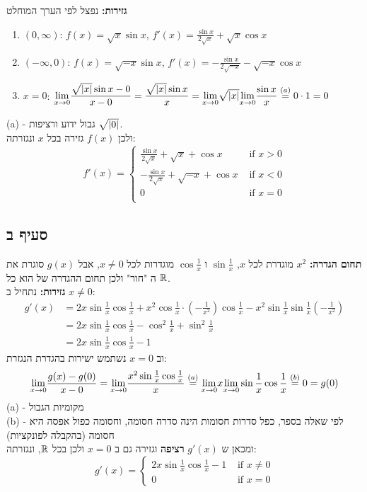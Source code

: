 \documentclass{article}
\begin{document}
	\textbf{גזירות:} נפצל לפי הערך המוחלט
	\begin{enumerate}
		\item $(0, \infty)$: $f(x) = \sqrt{x} \sin x$, $f'(x) = \frac{\sin x}{2\sqrt{x}} + \sqrt{x}\cos x$
		\item $(-\infty, 0)$: $f(x) = \sqrt{-x} \sin x$, $f'(x) = - \frac{\sin x}{2\sqrt{-x}} - \sqrt{-x} \cos x$
		\item $x = 0$: $\displaystyle{\lim_{x \to 0}} \frac{\sqrt{\left| x \right|} \sin x - 0}{ x -0} = \frac{\sqrt{\left| x \right|} \sin x}{x} = \displaystyle{\lim_{x \to 0}}\sqrt{\left| x \right|}\displaystyle{\lim_{x \to 0}}\frac{\sin x}{x} \overset{(a)}= 0 \cdot 1 = 0$
	\end{enumerate}
	(a) - גבול ידוע ורציפות $\sqrt{\left| 0 \right|}$. \\
	ולכן $f(x)$ גזירה בכל $x$ ונגזרתה:
	\[
	f'(x) = \begin{cases}
		\frac{\sin x}{2\sqrt{x}} + \sqrt{x} + \cos x &\text{ if } x > 0 \\
		-\frac{\sin x}{2\sqrt{x}} + \sqrt{-x} + \cos x &\text{ if } x < 0 \\
		0 &\text{ if } x = 0 \\
	\end{cases}
	\]
	\subsection*{סעיף ב}
	\textbf{תחום הגדרה:} $x^2$ מוגדרת לכל $x$, $\sin \frac{1}{x}$ ו $\cos \frac{1}{x}$
	מוגדרות לכל $x \neq 0$, אבל $g(x)$ סוגרת את ה "חור" ולכן תחום ההגדרה של הוא כל $\mathbb{R}$. \\
	\textbf{גזירות:} נתחיל ב $x \neq 0$:
	\begin{align*}
		g'(x) &= 2x \sin \frac{1}{x} \cos \frac{1}{x} + x^2 \cos \frac{1}{x} \cdot (- \frac{1}{x^2}) \cos \frac{1}{x} - x^2 \sin \frac{1}{x}\sin \frac{1}{x}(-\frac{1}{x^2}) \\
		&= 2x\sin \frac{1}{x} \cos \frac{1}{x} - \cos^2 \frac{1}{x} + \sin^2 \frac{1}{x} \\
		&= 2x \sin \frac{1}{x} \cos \frac{1}{x} - 1
	\end{align*}
	וב $x = 0 $ נשתמש ישירות בהגדרת הנגזרת:
	\[
	\displaystyle{\lim_{x \to 0}} \frac{g(x) - g(0)}{x - 0} =
	\displaystyle{\lim_{x \to 0}} \frac{x^2 \sin \frac{1}{x} \cos \frac{1}{x}}{x} \overset{(a)}=
	\displaystyle{\lim_{x \to 0}} x \displaystyle{\lim_{x \to 0}} \sin \frac{1}{x} \cos \frac{1}{x} \overset{(b)}=
	0 = g(0)
	\]
	(a) - מקומיות הגבול \\
	(b) - לפי שאלה בספר, כפל סדרות חסומות הינה סדרה חסומה, וחסומה כפול אפסה היא חסומה (בהקבלה לפונקציות) \\
	ומכאן ש $g'(x)$ \textbf{רציפה} וגזירה גם ב $x = 0$ ולכן בכל $\mathbb{R}$, ונגזרתה:
	\[
	g'(x) = \begin{cases}
		2x \sin \frac{1}{x} \cos \frac{1}{x} - 1 &\text{ if } x \neq 0 \\
		0 &\text{ if } x = 0
	\end{cases}
	\]
\end{document}
